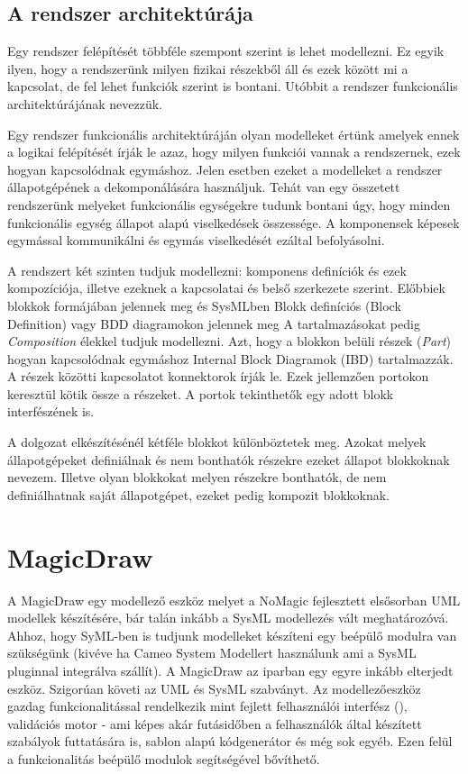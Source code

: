 \subsection{A rendszer architektúrája}
Egy rendszer felépítését többféle szempont szerint is lehet modellezni. Ez egyik ilyen, hogy a rendszerünk milyen fizikai részekből áll és ezek között mi a kapcsolat, de fel lehet funkciók szerint is bontani. Utóbbit a rendszer funkcionális architektúrájának nevezzük.

Egy rendszer funkcionális architektúráján olyan modelleket értünk amelyek ennek a logikai felépítését írják le azaz, hogy milyen funkciói vannak a rendszernek, ezek hogyan kapcsolódnak egymáshoz. Jelen esetben ezeket a modelleket a rendszer állapotgépének a dekomponálására használjuk. Tehát van egy összetett rendszerünk melyeket funkcionális egységekre tudunk bontani úgy, hogy minden funkcionális egység állapot alapú viselkedések összessége. A komponensek képesek egymással kommunikálni és egymás viselkedését ezáltal befolyásolni.

A rendszert két szinten tudjuk modellezni: komponens definíciók és ezek kompozíciója, illetve ezeknek a kapcsolatai és belső szerkezete szerint. Előbbiek blokkok formájában jelennek meg és SysMLben Blokk definíciós (Block Definition) vagy BDD diagramokon jelennek meg A tartalmazásokat pedig \emph{Composition} élekkel tudjuk modellezni. Azt, hogy a blokkon belüli részek (\emph{Part}) hogyan kapcsolódnak egymáshoz Internal Block Diagramok (IBD) tartalmazzák. A részek közötti kapcsolatot konnektorok írják le. Ezek jellemzően portokon keresztül kötik össze a részeket. A portok tekinthetők egy adott blokk interfészének is.

A dolgozat elkészítésénél kétféle blokkot különböztetek meg. Azokat melyek állapotgépeket definiálnak és nem bonthatók részekre ezeket állapot blokkoknak nevezem. Illetve olyan blokkokat melyen részekre bonthatók, de nem definiálhatnak saját állapotgépet, ezeket pedig kompozit blokkoknak.

\section{MagicDraw}

A MagicDraw egy modellező eszköz melyet a NoMagic fejlesztett elsősorban UML modellek készítésére, bár talán inkább a SysML modellezés vált meghatározóvá. Ahhoz, hogy SyML-ben is tudjunk modelleket készíteni egy beépülő modulra van szükségünk (kivéve ha Cameo System Modellert használunk ami a SysML pluginnal integrálva szállít). A MagicDraw az iparban egy egyre inkább elterjedt eszköz. Szigorúan követi az UML és SysML szabványt.
Az modellezőeszköz gazdag funkcionalitással rendelkezik mint fejlett felhasználói interfész (), validációs motor - ami képes akár futásidőben a felhasználók által készített szabályok futtatására is, sablon alapú kódgenerátor és még sok egyéb. Ezen felül a funkcionalitás beépülő modulok segítségével bővíthető.

